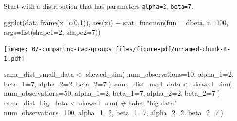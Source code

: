 \documentclass[
  letterpaper,
  DIV=11,
  numbers=noendperiod]{scrreprt}
\newenvironment{Shaded}{\begin{snugshade}}{\end{snugshade}}
\newcommand{\AttributeTok}[1]{\textcolor[rgb]{0.40,0.45,0.13}{#1}}
\newcommand{\CommentTok}[1]{\textcolor[rgb]{0.37,0.37,0.37}{#1}}
\newcommand{\DecValTok}[1]{\textcolor[rgb]{0.68,0.00,0.00}{#1}}
\newcommand{\FunctionTok}[1]{\textcolor[rgb]{0.28,0.35,0.67}{#1}}
\newcommand{\NormalTok}[1]{\textcolor[rgb]{0.00,0.23,0.31}{#1}}
\newcommand{\OtherTok}[1]{\textcolor[rgb]{0.00,0.23,0.31}{#1}}
\newcommand{\SpecialCharTok}[1]{\textcolor[rgb]{0.37,0.37,0.37}{#1}}
\begin{document}
Start with a distribution that has parameters \texttt{alpha=2},
\texttt{beta=7}.

\begin{Shaded}
\begin{Highlighting}[]
\FunctionTok{ggplot}\NormalTok{(}\FunctionTok{data.frame}\NormalTok{(}\AttributeTok{x=}\FunctionTok{c}\NormalTok{(}\DecValTok{0}\NormalTok{,}\DecValTok{1}\NormalTok{)), }\FunctionTok{aes}\NormalTok{(x)) }\SpecialCharTok{+} 
  \FunctionTok{stat\_function}\NormalTok{(}\AttributeTok{fun =}\NormalTok{ dbeta, }\AttributeTok{n=}\DecValTok{100}\NormalTok{, }\AttributeTok{args=}\FunctionTok{list}\NormalTok{(}\AttributeTok{shape1=}\DecValTok{2}\NormalTok{, }\AttributeTok{shape2=}\DecValTok{7}\NormalTok{))}
\end{Highlighting}
\end{Shaded}

\texttt{[image: 07-comparing-two-groups\_files/figure-pdf/unnamed-chunk-8-1.pdf]}

\begin{Shaded}
\begin{Highlighting}[]
\NormalTok{same\_dist\_small\_data }\OtherTok{\textless{}{-}} \FunctionTok{skewed\_sim}\NormalTok{(}
  \AttributeTok{num\_observations=}\DecValTok{10}\NormalTok{, }
  \AttributeTok{alpha\_1=}\DecValTok{2}\NormalTok{, }\AttributeTok{beta\_1=}\DecValTok{7}\NormalTok{, }
  \AttributeTok{alpha\_2=}\DecValTok{2}\NormalTok{, }\AttributeTok{beta\_2=}\DecValTok{7}
\NormalTok{  )}
\NormalTok{same\_dist\_med\_data }\OtherTok{\textless{}{-}} \FunctionTok{skewed\_sim}\NormalTok{(}
  \AttributeTok{num\_observations=}\DecValTok{50}\NormalTok{, }
  \AttributeTok{alpha\_1=}\DecValTok{2}\NormalTok{, }\AttributeTok{beta\_1=}\DecValTok{7}\NormalTok{, }
  \AttributeTok{alpha\_2=}\DecValTok{2}\NormalTok{, }\AttributeTok{beta\_2=}\DecValTok{7}
\NormalTok{  )}
\NormalTok{same\_dist\_big\_data }\OtherTok{\textless{}{-}} \FunctionTok{skewed\_sim}\NormalTok{( }\CommentTok{\# haha, "big data"}
  \AttributeTok{num\_observations=}\DecValTok{100}\NormalTok{, }
  \AttributeTok{alpha\_1=}\DecValTok{2}\NormalTok{, }\AttributeTok{beta\_1=}\DecValTok{7}\NormalTok{, }
  \AttributeTok{alpha\_2=}\DecValTok{2}\NormalTok{, }\AttributeTok{beta\_2=}\DecValTok{7}
\NormalTok{  )}
\end{Highlighting}
\end{Shaded}
\end{document}
